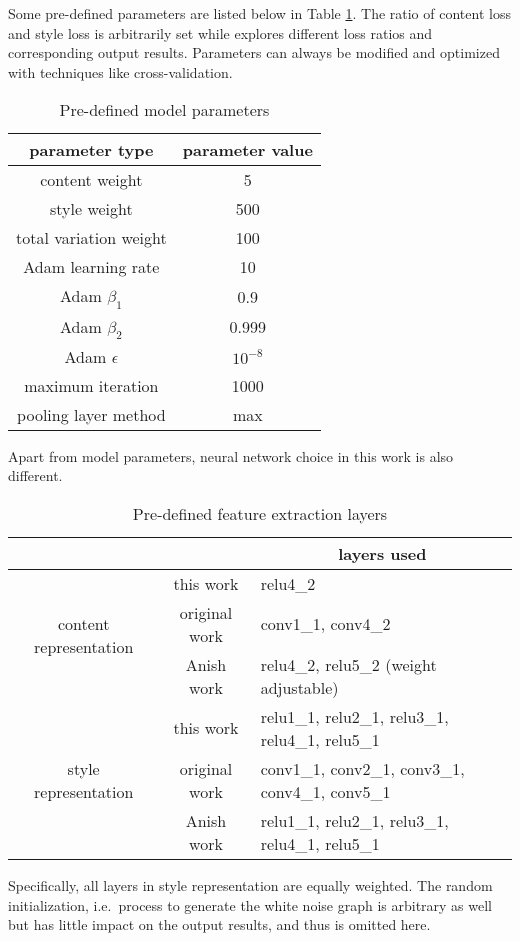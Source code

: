 Some pre-defined parameters are listed below in Table \ref{table:parameters}.
The ratio of content loss and style loss is arbitrarily set while \cite{Gatys:2016gj}
explores different loss ratios and corresponding output results.
Parameters can always be modified and optimized with techniques like cross-validation.

	\begin{table}[!htb]
	\center
	\begin{tabular}{c|c}
	\hline
	parameter type & parameter value \\ \hline
	content weight & 5 \\
	style weight & 500 \\
	total variation weight & 100 \\
	Adam learning rate & 10 \\
	Adam $\beta_1$ & 0.9 \\
	Adam $\beta_2$ & 0.999 \\
	Adam $\epsilon$ & $10^{-8}$ \\
	maximum iteration & 1000 \\
	pooling layer method & max \\
	\hline
	\end{tabular}
	\caption{Pre-defined model parameters}
	\label{table:parameters}
	\end{table}

Apart from model parameters, neural network choice in this work is also different.
	
	\begin{table}[!htb]
	\center
	\begin{tabular}{c|c|l}
	\hline
	& & \multicolumn{1}{c}{layers used} \\ \hline
	\multirow{3}{*}{content representation}
		& this work & relu4\_2 \\
		& original work & conv1\_1, conv4\_2 \\
		& Anish work & relu4\_2, relu5\_2 (weight adjustable) \\ \hline
	\multirow{3}{*}{style representation}
		& this work & relu1\_1, relu2\_1, relu3\_1, relu4\_1, relu5\_1 \\
		& original work & conv1\_1, conv2\_1, conv3\_1, conv4\_1, conv5\_1 \\
		& Anish work & relu1\_1, relu2\_1, relu3\_1, relu4\_1, relu5\_1 \\
	\hline
	\end{tabular}
	\caption{Pre-defined feature extraction layers}
	\label{table:layers}
	\end{table}

Specifically, all layers in style representation are equally weighted.
The random initialization, i.e.\ process to generate the white noise graph
is arbitrary as well but has little impact on the output results,
and thus is omitted here.
